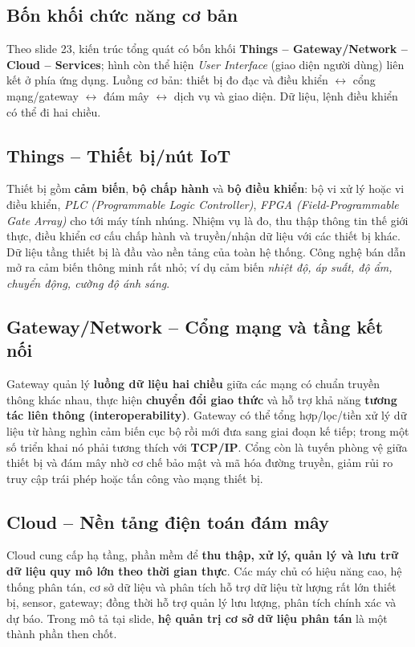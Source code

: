 \subsection{Bốn khối chức năng cơ bản}
Theo slide 23, kiến trúc tổng quát có bốn khối \textbf{Things -- Gateway/Network -- Cloud -- Services}; hình còn thể hiện \emph{User Interface} (giao diện người dùng) liên kết ở phía ứng dụng. Luồng cơ bản: thiết bị đo đạc và điều khiển $\leftrightarrow$ cổng mạng/gateway $\leftrightarrow$ đám mây $\leftrightarrow$ dịch vụ và giao diện. Dữ liệu, lệnh điều khiển có thể đi hai chiều.

\subsection{Things -- Thiết bị/nút IoT}
Thiết bị gồm \textbf{cảm biến}, \textbf{bộ chấp hành} và \textbf{bộ điều khiển}: bộ vi xử lý hoặc vi điều khiển, \emph{PLC (Programmable Logic Controller)}, \emph{FPGA (Field-Programmable Gate Array)} cho tới máy tính nhúng. Nhiệm vụ là đo, thu thập thông tin thế giới thực, điều khiển cơ cấu chấp hành và truyền/nhận dữ liệu với các thiết bị khác. Dữ liệu tầng thiết bị là đầu vào nền tảng của toàn hệ thống. Công nghệ bán dẫn mở ra cảm biến thông minh rất nhỏ; ví dụ cảm biến \emph{nhiệt độ, áp suất, độ ẩm, chuyển động, cường độ ánh sáng}.

\subsection{Gateway/Network -- Cổng mạng và tầng kết nối}
Gateway quản lý \textbf{luồng dữ liệu hai chiều} giữa các mạng có chuẩn truyền thông khác nhau, thực hiện \textbf{chuyển đổi giao thức} và hỗ trợ khả năng \textbf{tương tác liên thông (interoperability)}. Gateway có thể tổng hợp/lọc/tiền xử lý dữ liệu từ hàng nghìn cảm biến cục bộ rồi mới đưa sang giai đoạn kế tiếp; trong một số triển khai nó phải tương thích với \textbf{TCP/IP}. Cổng còn là tuyến phòng vệ giữa thiết bị và đám mây nhờ cơ chế bảo mật và mã hóa đường truyền, giảm rủi ro truy cập trái phép hoặc tấn công vào mạng thiết bị.

\subsection{Cloud -- Nền tảng điện toán đám mây}
Cloud cung cấp hạ tầng, phần mềm để \textbf{thu thập, xử lý, quản lý và lưu trữ dữ liệu quy mô lớn theo thời gian thực}. Các máy chủ có hiệu năng cao, hệ thống phân tán, cơ sở dữ liệu và phân tích hỗ trợ dữ liệu từ lượng rất lớn thiết bị, sensor, gateway; đồng thời hỗ trợ quản lý lưu lượng, phân tích chính xác và dự báo. Trong mô tả tại slide, \textbf{hệ quản trị cơ sở dữ liệu phân tán} là một thành phần then chốt.

